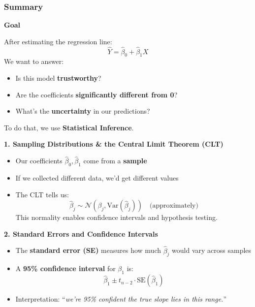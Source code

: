 \subsubsection{Summary}

\begin{flushleft}
    \textcolor{Green3}{ \textbf{Goal}}
\end{flushleft}
After estimating the regression line:
\begin{equation*}
    \hat{Y} = \hat{\beta}_0 + \hat{\beta}_1 X    
\end{equation*}
We want to answer:
\begin{itemize}
    \item Is this model \textbf{trustworthy}?
    \item Are the coefficients \textbf{significantly different from 0}?
    \item What's the \textbf{uncertainty} in our predictions?
\end{itemize}
To do that, we use \textbf{Statistical Inference}.

\highspace
\begin{flushleft}
    \textcolor{Green3}{ \textbf{1. Sampling Distributions \& the Central Limit Theorem (CLT)}}
\end{flushleft}
\begin{itemize}
    \item Our coefficients $\hat{\beta}_0, \hat{\beta}_1$ come from a \textbf{sample}
    \item If we collected different data, we'd get different values
    \item The CLT tells us:
    \begin{equation*}
        \hat{\beta}_j \sim \mathcal{N}(\beta_j, \text{Var}(\hat{\beta}_j)) \quad \text{(approximately)}
    \end{equation*}
    This normality enables confidence intervals and hypothesis testing.
\end{itemize}

\highspace
\begin{flushleft}
    \textcolor{Green3}{ \textbf{2. Standard Errors and Confidence Intervals}}
\end{flushleft}
\begin{itemize}
    \item The \textbf{standard error (SE)} measures how much $\hat{\beta}_j$ would vary across samples
    \item A \textbf{95\% confidence interval} for $\beta_1$ is:
    \begin{equation*}
        \hat{\beta}_1 \pm t_{n-2} \cdot \text{SE}\left(\hat{\beta}_1\right)
    \end{equation*}
    \item Interpretation: ``\emph{we're 95\% confident the true slope lies in this range.}''
\end{itemize}

